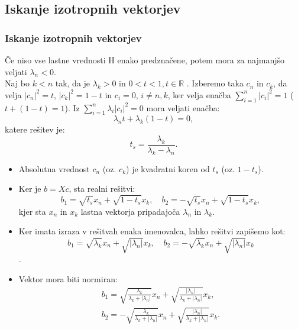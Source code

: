 \documentclass{beamer}
\newcommand{\abs}[1]{ \left\lvert#1\right\rvert}
\newcommand{\R}{\mathbb R}
\begin{document}
\subsection{Iskanje izotropnih vektorjev}
\begin{frame}
\frametitle{Iskanje izotropnih vektorjev}
\begin{block}{}
Če niso vse lastne vrednosti H enako predznačene, potem mora za najmanjšo veljati $\lambda_n <0$. \medskip \\
 Naj bo $k<n$ tak, da je $\lambda_k >0$ in $0<t<1, t\in \R$ . Izberemo \medskip taka $c_n$ in $c_k$, da velja  $\abs{c_n}^2 =t$, $\abs{c_k}^2=1-t$ in $c_i =0$, $i\not=n,k$, \medskip  ker velja enačba $\sum_{i=1}^{n}\abs{c_i}^2=1$ ($t+ (1-t)=1$). Iz \medskip $\sum_{i=1}^{n} \lambda_i \abs{c_i}^2=0$ mora veljati enačba: $$\lambda_n t +\lambda_k (1-t)=0,$$ katere rešitev je:
\begin{equation*}
t_s=\frac{\lambda_k}{\lambda_k -\lambda_n}.
\end{equation*}
\end{block}
\end{frame}
\begin{frame}
\begin{itemize}
\item Absolutna vrednost $c_n$ (oz. $c_k$) je kvadratni koren od $t_s$ (oz. $1-t_s$).
\item Ker je $b=Xc$, sta realni rešitvi: $$b_1=\sqrt{t_s}x_n +\sqrt{1-t_s}x_k,\quad b_2=-\sqrt{t_s}x_n+\sqrt{1-t_s}x_k,$$ kjer sta $x_n$ in $x_k$ lastna vektorja pripadajoča  $\lambda_n$ in $\lambda_k$.\pause
\item Ker imata izraza v rešitvah enaka imenovalca, lahko rešitvi zapišemo kot: $$b_1=\sqrt{\lambda_k}x_n+\sqrt{\abs{\lambda_n}}x_k, \quad b_2=-\sqrt{\lambda_k}x_n+\sqrt{\abs{\lambda_n}}x_k$$.\pause
\item Vektor mora biti normiran:
\begin{align*}
b_1=\sqrt{\frac{\lambda_k}{\lambda_k +\abs{\lambda_n}}}x_n + \sqrt{\frac{\abs{\lambda_n}}{\lambda_k +\abs{\lambda_n}}}x_k,\\ b_2=-\sqrt{\frac{\lambda_k}{\lambda_k +\abs{\lambda_n}}}x_n + \sqrt{\frac{\abs{\lambda_n}}{\lambda_k +\abs{\lambda_n}}}x_k.
\end{align*}
\end{itemize}
\end{frame}
\end{document}
